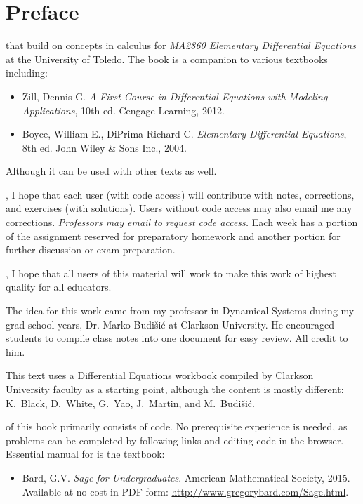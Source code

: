\section*{Preface}
\begin{fullwidth}

 that build on concepts in calculus for \emph{MA2860 Elementary Differential Equations} at the University of Toledo. The book is a companion to various textbooks including:
\begin{itemize}
    \item Zill, Dennis G. \emph{A First Course in Differential Equations with Modeling Applications}, 10th ed. Cengage Learning, 2012.
    \item Boyce, William E., DiPrima Richard C. \emph{Elementary Differential Equations}, 8th ed. John Wiley \& Sons Inc., 2004.
\end{itemize}
Although it can be used with other texts as well.

, I hope that each user (with code access) will contribute with notes, corrections, and exercises (with solutions). Users without code access may also email me any corrections. \emph{Professors may email to request code access.} Each week has a portion of the assignment reserved for preparatory homework and another portion for further discussion or exam preparation.

, I hope that all users of this material will work to make this work of highest quality for all educators.

\noindent The idea for this work came from my professor in Dynamical Systems during my grad school years, Dr. Marko Budi\v{s}i\'{c} at Clarkson University. He encouraged students to compile class notes into one document for easy review. All credit to him.

\noindent This text uses a Differential Equations workbook compiled by Clarkson University faculty as a starting point, although the content is mostly different: K.~Black, D.~White, G.~Yao, J.~Martin, and M.~Budi\v{s}i\'{c}.

 of this book primarily consists of \sage code. No prerequisite experience is needed, as problems can be completed by following links and editing code in the browser. Essential manual for \sage is the textbook:
\begin{itemize}
    \item Bard, G.V. \emph{Sage for Undergraduates}. American Mathematical Society, 2015. Available at no cost in PDF form: \url{http://www.gregorybard.com/Sage.html}.
\end{itemize}


\end{fullwidth}
